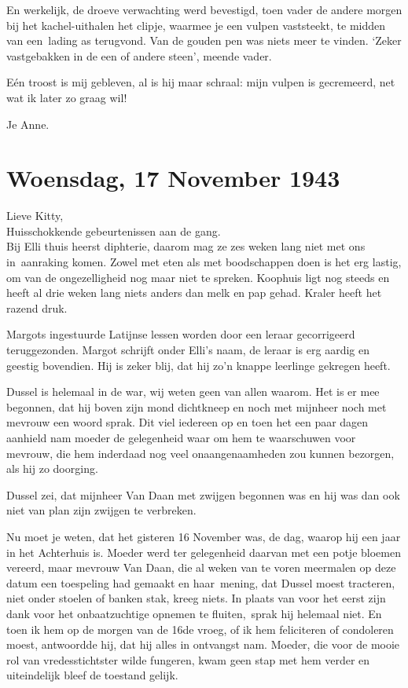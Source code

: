 \documentclass{book}
\begin{document}
En werkelijk, de droeve verwachting werd bevestigd, toen vader de andere morgen
bij het kachel-uithalen het clipje, waarmee je een vulpen vaststeekt, te midden
van een~lading as terugvond. Van de gouden pen was niets meer te vinden. `Zeker
vastgebakken in de een of andere steen', meende vader.

Eén troost is mij gebleven, al is hij maar schraal: mijn vulpen is gecremeerd,
net wat ik later zo graag wil!

Je Anne.

\section*{Woensdag, 17 November 1943}

Lieve Kitty,\\
Huisschokkende gebeurtenissen aan de gang.\\
Bij Elli thuis
heerst diphterie, daarom mag ze zes weken lang niet met ons in~aanraking komen.
Zowel met eten als met boodschappen doen is het erg lastig, om van de
ongezelligheid nog maar niet te spreken. Koophuis ligt nog steeds en heeft al
drie weken lang niets anders dan melk en pap gehad. Kraler heeft het razend
druk.

Margots ingestuurde Latijnse lessen worden door een leraar gecorrigeerd
teruggezonden. Margot schrijft onder Elli's naam, de leraar is erg aardig en
geestig bovendien. Hij is zeker blij, dat hij zo'n knappe leerlinge gekregen
heeft.

Dussel is helemaal in de war, wij weten geen van allen waarom. Het is er mee
begonnen, dat hij boven zijn mond dichtkneep en noch met mijnheer noch met
mevrouw een woord sprak. Dit viel iedereen op en toen het een paar dagen
aanhield nam moeder de gelegenheid waar om hem te waarschuwen voor mevrouw, die
hem inderdaad nog veel onaangenaamheden zou kunnen bezorgen, als hij zo
doorging.

Dussel zei, dat mijnheer Van Daan met zwijgen begonnen was en hij was dan ook
niet van plan zijn zwijgen te verbreken.

Nu moet je weten, dat het gisteren 16 November was, de dag, waarop hij een jaar
in het Achterhuis is. Moeder werd ter gelegenheid daarvan met een potje bloemen
vereerd, maar mevrouw Van Daan, die al weken van te voren meermalen op deze
datum een toespeling had gemaakt en haar~mening, dat Dussel moest tracteren,
niet onder stoelen of banken stak, kreeg niets. In plaats van voor het eerst
zijn dank voor het onbaatzuchtige opnemen te fluiten,~sprak hij helemaal niet.
En toen ik hem op de morgen van de 16de vroeg, of ik hem feliciteren of
condoleren moest, antwoordde hij, dat hij alles in ontvangst nam. Moeder, die
voor de mooie rol van vredesstichtster wilde fungeren, kwam geen stap met hem
verder en uiteindelijk bleef de toestand gelijk.
\end{document}
